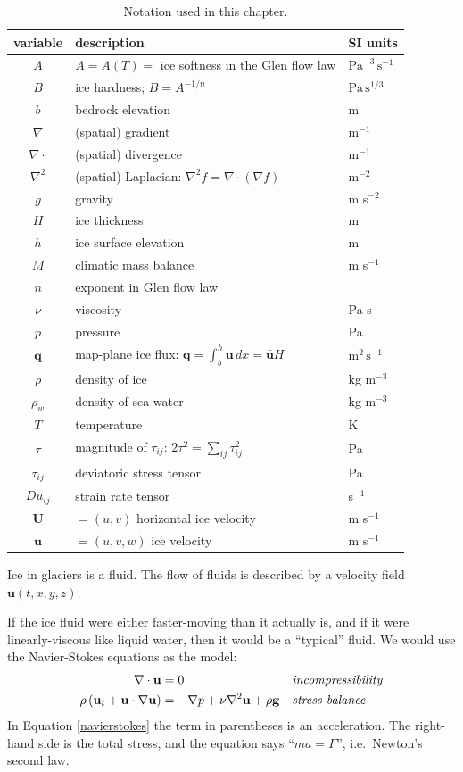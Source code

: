 \documentclass[titlepage,letterpaper,final,12pt]{scrartcl}
\newcommand{\bq}{\mathbf{q}}
\begin{document}
\begin{table}
\caption{Notation used in this chapter.}
\label{tab:notation}
\begin{tabular}{cll}
variable  & description & SI units \\ 
\hline
$A$ & $A=A(T)=$ ice softness in the Glen flow law & $\text{Pa}^{-3}\,\text{s}^{-1}$ \\
$B$ & ice hardness; $B=A^{-1/n}$ & $\text{Pa}\,\text{s}^{1/3}$ \\
$b$ & bedrock elevation & m \\
$\nabla$ & (spatial) gradient & m$^{-1}$ \\
$\nabla\cdot$ & (spatial) divergence & m$^{-1}$ \\
$\nabla^2$ & (spatial) Laplacian: $\nabla^2 f = \nabla\cdot(\nabla f)$ & m$^{-2}$ \\
$g$ & gravity & m s$^{-2}$ \\
$H$ & ice thickness & m \\
$h$ & ice surface elevation & m \\
$M$ & climatic mass balance & m s$^{-1}$ \\
$n$ & exponent in Glen flow law & \\
$\nu$ & viscosity & Pa s \\
$p$ & pressure & Pa \\
$\bq$ & map-plane ice flux: $\bq = \int_{b}^{h} \mathbf{u}\,dx = \bar{\mathbf{u}} H$ & $\text{m}^2\,\text{s}^{-1}$ \\
$\rho$ & density of ice & kg m$^{-3}$ \\
$\rho_w$ & density of sea water & kg m$^{-3}$ \\
$T$ & temperature & K \\
$\tau$ & magnitude of $\tau_{ij}$: $2 \tau^2 = \sum_{ij} \tau_{ij}^2$ & Pa \\
$\tau_{ij}$ & deviatoric stress tensor & Pa \\
$Du_{ij}$ & strain rate tensor & s$^{-1}$ \\
$\mathbf{U}$ & $=(u,v)$ horizontal ice velocity & m s$^{-1}$ \\
$\mathbf{u}$ & $=(u,v,w)$ ice velocity & m s$^{-1}$ \\
\end{tabular}
\end{table}

Ice in glaciers is a fluid.  The flow of fluids is described by a velocity field $\mathbf{u}(t,x,y,z)$.

If the ice fluid were either faster-moving than it actually is, and if it were linearly-viscous like liquid water, then it would be a ``typical'' fluid.  We would use the Navier-Stokes equations as the model:
\begin{align}
\nabla \cdot \mathbf{u} &= 0 &&\text{\emph{incompressibility}} \label{incompressible} \\
\rho \left(\mathbf{u}_t + \mathbf{u}\cdot\nabla \mathbf{u}\right) &= -\nabla p + \nu \nabla^2 \mathbf{u} + \rho \mathbf{g} &&\text{\emph{stress balance}} \label{navierstokes}
\end{align}
In Equation \eqref{navierstokes} the term in parentheses is an acceleration.  The right-hand side is the total stress, and the equation says ``$ma=F$'', i.e.~Newton's second law.
\end{document}
